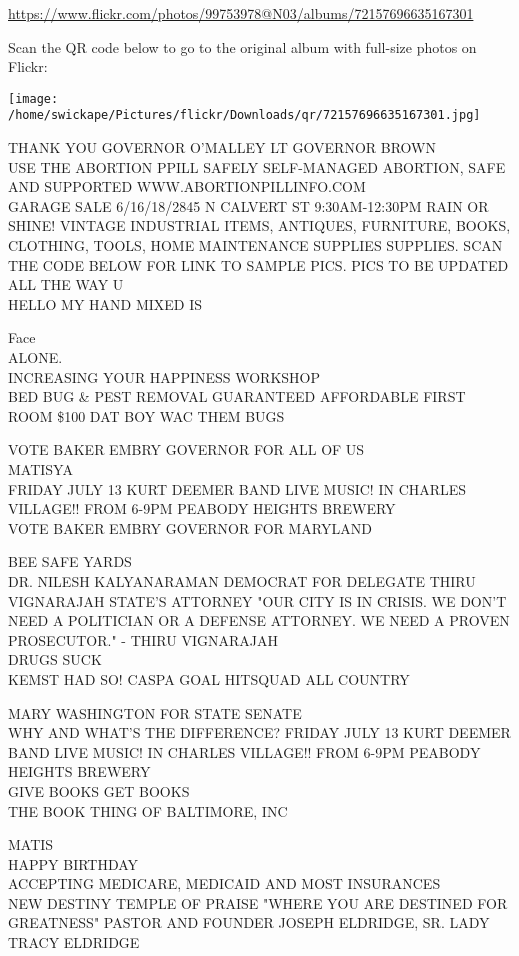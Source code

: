 \documentclass[10pt,letterpaper]{article}
\begin{document}
\url{https://www.flickr.com/photos/99753978@N03/albums/72157696635167301}

Scan the QR code below to go to the original album with full-size photos on Flickr:

\texttt{[image: /home/swickape/Pictures/flickr/Downloads/qr/72157696635167301.jpg]}


THANK YOU GOVERNOR O'MALLEY LT GOVERNOR BROWN\\
USE THE ABORTION PPILL SAFELY SELF{-}MANAGED ABORTION, SAFE AND SUPPORTED WWW.ABORTIONPILLINFO.COM\\
GARAGE SALE 6/16/18/2845 N CALVERT ST 9:30AM{-}12:30PM RAIN OR SHINE!  VINTAGE INDUSTRIAL ITEMS, ANTIQUES, FURNITURE, BOOKS, CLOTHING, TOOLS, HOME MAINTENANCE SUPPLIES SUPPLIES.  SCAN THE CODE BELOW FOR LINK TO SAMPLE PICS.  PICS TO BE UPDATED ALL THE WAY U\\
HELLO MY HAND MIXED IS

Face\\
ALONE.\\
INCREASING YOUR HAPPINESS WORKSHOP\\
BED BUG \& PEST REMOVAL GUARANTEED AFFORDABLE FIRST ROOM \$100 DAT BOY WAC THEM BUGS

VOTE BAKER EMBRY GOVERNOR FOR ALL OF US\\
MATISYA\\
FRIDAY JULY 13 KURT DEEMER BAND LIVE MUSIC!  IN CHARLES VILLAGE!!  FROM 6{-}9PM PEABODY HEIGHTS BREWERY\\
VOTE BAKER EMBRY GOVERNOR FOR MARYLAND

BEE SAFE YARDS\\
DR. NILESH KALYANARAMAN DEMOCRAT FOR DELEGATE THIRU VIGNARAJAH STATE'S ATTORNEY "OUR CITY IS IN CRISIS.  WE DON'T NEED A POLITICIAN OR A DEFENSE ATTORNEY.  WE NEED A PROVEN PROSECUTOR." {-} THIRU VIGNARAJAH\\
DRUGS SUCK\\
KEMST HAD SO!  CASPA GOAL HITSQUAD ALL COUNTRY

MARY WASHINGTON FOR STATE SENATE\\
WHY AND WHAT'S THE DIFFERENCE?  FRIDAY JULY 13 KURT DEEMER BAND LIVE MUSIC!  IN CHARLES VILLAGE!!  FROM 6{-}9PM PEABODY HEIGHTS BREWERY\\
GIVE BOOKS GET BOOKS\\
THE BOOK THING OF BALTIMORE, INC

MATIS\\
HAPPY BIRTHDAY\\
ACCEPTING MEDICARE, MEDICAID AND MOST INSURANCES\\
NEW DESTINY TEMPLE OF PRAISE "WHERE YOU ARE DESTINED FOR GREATNESS"  PASTOR AND FOUNDER JOSEPH ELDRIDGE, SR.  LADY TRACY ELDRIDGE
\end{document}
